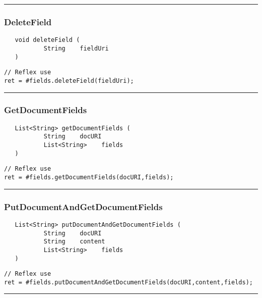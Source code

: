 \rule{15cm}{2pt}
\subsubsection{DeleteField}
\label{Api:DeleteField}
\begin{verbatim}
   void deleteField (
           String    fieldUri
   )
\end{verbatim}
\begin{lstlisting}[language=reflex]
// Reflex use
ret = #fields.deleteField(fieldUri);
\end{lstlisting}



\rule{15cm}{2pt}
\subsubsection{GetDocumentFields}
\label{Api:GetDocumentFields}
\begin{verbatim}
   List<String> getDocumentFields (
           String    docURI
           List<String>    fields
   )
\end{verbatim}
\begin{lstlisting}[language=reflex]
// Reflex use
ret = #fields.getDocumentFields(docURI,fields);
\end{lstlisting}



\rule{15cm}{2pt}
\subsubsection{PutDocumentAndGetDocumentFields}
\label{Api:PutDocumentAndGetDocumentFields}
\begin{verbatim}
   List<String> putDocumentAndGetDocumentFields (
           String    docURI
           String    content
           List<String>    fields
   )
\end{verbatim}
\begin{lstlisting}[language=reflex]
// Reflex use
ret = #fields.putDocumentAndGetDocumentFields(docURI,content,fields);
\end{lstlisting}



\rule{15cm}{2pt}
